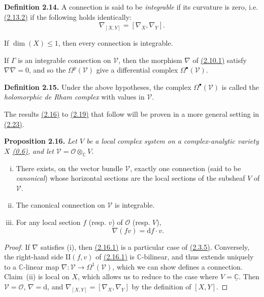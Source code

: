 \documentclass{report}
\newenvironment{itenv}[1]
  {\phantomsection\par\medskip\noindent\textbf{#1.}\itshape}
  {\par\medskip}
\newenvironment{rmenv}[1]
  {\phantomsection\par\medskip\noindent\textbf{#1.}\rmfamily}
  {\par\medskip}
\renewcommand{\cal}[1]{{\mathcal{#1}}}
\newcommand{\CC}{\mathbb{C}}
\newcommand{\dd}{\mathrm{d}}
\newcommand{\II}{\mathrm{II}}
\renewcommand{\leq}{\leqslant}
\newcommand{\oldpage}[1]{\marginpar{\footnotesize$\Big\vert$ \textit{p.~#1}}}
\begin{document}
\begin{rmenv}{Definition 2.14}
\label{I.2.14}
  A connection is said to be \emph{integrable} if its curvature is zero, i.e. \hyperref[I.2.13.2]{(2.13.2)} if the following holds identically:
  \[
    \nabla_{[X,Y]} = [\nabla_X,\nabla_Y].
  \]
\end{rmenv}
If $\dim(X)\leq1$, then every connection is integrable.

If $\Gamma$ is an integrable connection on $\cal{V}$, then the morphism $\nabla$ of \hyperref[I.2.10.1]{(2.10.1)} satisfy $\nabla\nabla=0$, and so the $\Omega^p(\cal{V})$ give a differential complex $\Omega^\bullet(\cal{V})$.

\begin{rmenv}{Definition 2.15}
\label{I.2.15}
  Under the above hypotheses, the complex $\Omega^\bullet(\cal{V})$ is called the \emph{holomorphic de Rham complex} with values in $\cal{V}$.
\end{rmenv}

\oldpage{12}
The results \hyperref[I.2.16]{(2.16)} to \hyperref[I.2.19]{(2.19)} that follow will be proven in a more general setting in \hyperref[I.2.23]{(2.23)}.

\begin{itenv}{Proposition 2.16}
\label{I.2.16}
  Let $V$ be a local complex system on a complex-analytic variety $X$ \hyperref[0.6]{(0.6)}, and let $\cal{V}=\cal{O}\otimes_\CC V$.
  \begin{enumerate}[(i)]
    \item There exists, on the vector bundle $\cal{V}$, exactly one connection (said to be \emph{canonical}) whose horizontal sections are the local sections of the subsheaf $V$ of $\cal{V}$.
    \item The canonical connection on $\cal{V}$ is integrable.
    \item For any local section $f$ (resp. $v$) of $\cal{O}$ (resp. $V$),
      \[
      \label{I.2.16.1}
        \nabla(fv) = \dd f\cdot v.
      \tag{2.16.1}
      \]
  \end{enumerate}
\end{itenv}

\begin{proof}
  If $\nabla$ satisfies (i), then \hyperref[I.2.16.1]{(2.16.1)} is a particular case of \hyperref[I.2.3.5]{(2.3.5)}.
  Conversely, the right-hand side $\II(f,v)$ of \hyperref[I.2.16.1]{(2.16.1)} is $\CC$-bilinear, and thus extends uniquely to a $\CC$-linear map $\nabla\colon\cal{V}\to\Omega^1(\cal{V})$, which we can show defines a connection.
  Claim~(ii) is local on $X$, which allows us to reduce to the case where $V=\underline{\CC}$.
  Then $\cal{V}=\cal{O}$, $\nabla=\dd$, and $\nabla_{[X,Y]}=[\nabla_X,\nabla_Y]$ by the definition of $[X,Y]$.
\end{proof}
\end{document}

